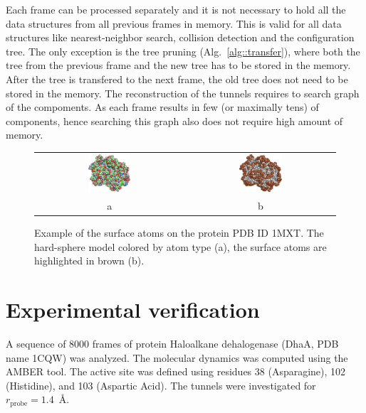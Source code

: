 \documentclass[usletter, 10pt, conference]{svjour3}      %
\def\probe{r_{\mathrm{probe}}}
\begin{document}
Each frame can be processed separately and it is not necessary to hold all the data structures from all previous frames in memory.
This is valid for all data structures like nearest-neighbor search, collision detection and the configuration tree.
The only exception is the tree pruning (Alg.~\ref{alg::transfer}), where both the tree from the previous frame and the new tree has to be stored in the memory.
After the tree is transfered to the next frame, the old tree does not need to be stored in the memory.
The reconstruction of the tunnels requires to search graph of the compoments. 
As each frame results in few (or maximally tens) of components, hence searching this graph also does not require high amount of memory.


\begin{figure}
\centering
\begin{tabular}{cc}
\includegraphics[width=0.3\textwidth]{fig/1mxta-alpha4} &
\includegraphics[width=0.3\textwidth]{fig/1mxta-alpha3} \\
a & b
\end{tabular}
\caption{\label{fig::surface}
Example of the surface atoms on the protein PDB ID 1MXT. The hard-sphere model colored by atom type (a), the surface atoms are highlighted in brown (b).
}
\end{figure}


\section{Experimental verification}




A sequence of 8000 frames of protein Haloalkane dehalogenase (DhaA, PDB name 1CQW) was analyzed.
The molecular dynamics was computed using the AMBER tool.
The active site was defined using residues 38 (Asparagine), 102 (Histidine), and 103 (Aspartic Acid).
The tunnels were investigated for $\probe=1.4$~\AA.
\end{document}
